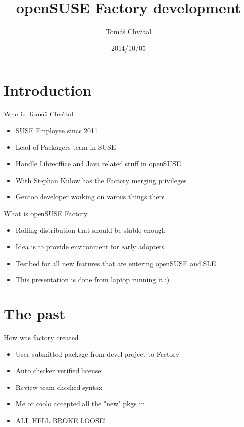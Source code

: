 \documentclass{beamer}
\author{Tom\'{a}\v{s} Chv\'{a}tal\newline {\small openSUSE Team}}
\title{openSUSE Factory development}
\date{2014/10/05}
\begin{document}
\begin{frame}[t,plain]
\titlepage
\end{frame}

\section{Introduction}

\begin{frame}[t]{Who is Tomáš Chvátal}
	\begin{itemize}
	\item SUSE Employee since 2011
	\item Lead of Packagers team in SUSE
	\item Handle Libreoffice and Java related stuff in openSUSE
	\item With Stephan  Kulow has the Factory merging privileges
	\item Gentoo developer working on varous things there
	\end{itemize}
\end{frame}

\begin{frame}[t]{What is openSUSE Factory}
	\begin{itemize}
	\item Rolling distribution that should be stable enough
	\item Idea is to provide environment for early adopters
	\item Testbed for all new features that are entering openSUSE and SLE
	\item This presentation is done from laptop running it :)
	\end{itemize}
\end{frame}

\section{The past}

\begin{frame}[t]{How was factory created}
	\begin{itemize}
	\item User submitted package from devel project to Factory
	\item Auto checker verified license
	\item Review team checked syntax
	\item Me or coolo accepted all the "new" pkgs in
	\item ALL HELL BROKE LOOSE!
	\end{itemize}
\end{frame}
\end{document}
